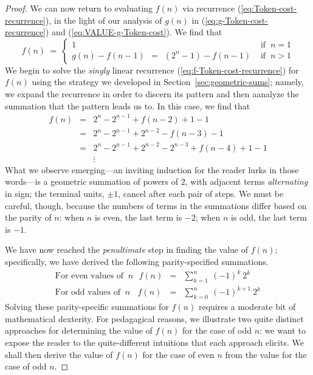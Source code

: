 \begin{proof}
We can now return to evaluating $f(n)$ via recurrence
(\ref{eq:Token-cost-recurrence}), in the light of our analysis of
$g(n)$ in (\ref{eq:g-Token-cost-recurrence}) and
(\ref{eq:VALUE-g-Token-cost}).  We find that 
\begin{equation}
\label{eq:f-Token-cost-recurrence}
f(n) \ = \ \left\{
\begin{array}{ll}
1 & \mbox{ if } \ n=1 \\
g(n) - f(n-1) \ \ = \ \
\left(2^{n} -1\right) - f(n-1) & \mbox{ if } \ n>1
\end{array}
\right.
\end{equation}
We begin to solve the {\em singly} linear recurrence
(\ref{eq:f-Token-cost-recurrence}) for $f(n)$ using the strategy we
developed in Section~\ref{sec:geometric-sums}; namely, we expand the
recurrence in order to discern its pattern and then aanalyze the
summation that the pattern leads us to.  In this case, we find that
\begin{eqnarray*}
f(n) & = & 2^{n} - 2^{n-1} + f(n-2) + 1 -1 \\
     & = & 2^{n} - 2^{n-1} + 2^{n-2} - f(n-3) -1 \\
     & = & 2^{n} - 2^{n-1} + 2^{n-2} - 2^{n-3} + f(n-4) +1-1 \\
     &   & \vdots
\end{eqnarray*}
What we observe emerging---an inviting induction for the reader lurks
in those words---is a geometric summation of powers of $2$, with
adjacent terms {\em alternating} in sign; the terminal units, $\pm 1$,
cancel after each pair of steps.  We must be careful, though, because
the numbers of terms in the summations differ based on the parity of
$n$: when $n$ is even, the last term is $-2$; when $n$ is odd, the
last term is $-1$.

We have now reached the {\em penultimate} step in finding the value of
$f(n)$; specifically, we have derived the following parity-specified
summations.
\begin{eqnarray}
\label{eq:EVEN-f-sum}
\mbox{For even values of } \ n \ \ \
f(n) & = &
\sum_{k=1}^n \ (-1)^{k} \ 2^{k} \\
\label{eq:ODD-f-sum}
\mbox{For odd values of } \ n \ \ \ \
f(n) & = &
\sum_{k=0}^n \ (-1)^{k+1} \ 2^{k}
\end{eqnarray}
Solving these parity-specific summations for $f(n)$ requires a
moderate bit of mathematical dexterity.  For pedagagical reasons, we
illustrate two quite distinct approaches for determining the value of
$f(n)$ for the case of odd $n$: we want to expose the reader to the
quite-different intuitions that each approach elicits.  We shall then
derive the value of $f(n)$ for the case of even $n$ from the value for
the case of odd $n$.


\end{proof}
